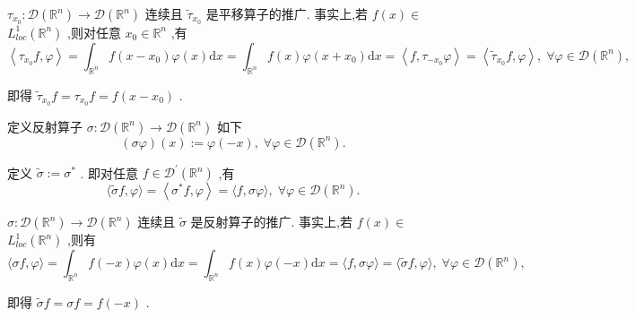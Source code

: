 \documentclass[lang=cn,newtx,10pt,scheme=chinese,thmcnt=chapter]{elegantbook}
\newcommand{\dif}{\mathrm{d}}
\begin{document}
\begin{note}
   \({\tau }_{{x}_{0}} : \mathcal{D}\left( {\mathbb{R}}^{n}\right)  \rightarrow  \mathcal{D}\left( {\mathbb{R}}^{n}\right)\) 连续且 \({\widetilde{\tau }}_{{x}_{0}}\) 是平移算子的推广. 事实上,若 \(f\left( x\right)  \in\)  \({L}_{loc}^{1}\left( {\mathbb{R}}^{n}\right)\) ,则对任意 \({x}_{0} \in  {\mathbb{R}}^{n}\) ,有
\begin{equation*}
\left\langle  {{\tau }_{{x}_{0}}f,\varphi }\right\rangle   = {\int }_{{\mathbb{R}}^{n}}f\left( {x - {x}_{0}}\right) \varphi \left( x\right) {\dif x} = {\int }_{{\mathbb{R}}^{n}}f\left( x\right) \varphi \left( {x + {x}_{0}}\right) {\dif x}
= \left\langle  {f,{\tau }_{-{x}_{0}}\varphi }\right\rangle   = \left\langle  {{\widetilde{\tau }}_{{x}_{0}}f,\varphi }\right\rangle  ,\;\forall \varphi  \in  \mathcal{D}\left( {\mathbb{R}}^{n}\right) ,
\end{equation*}

即得 \({\widetilde{\tau }}_{{x}_{0}}f = {\tau }_{{x}_{0}}f = f\left( {x - {x}_{0}}\right)\) .
\end{note}
\begin{definition}
  定义反射算子 \(\sigma  : \mathcal{D}\left( {\mathbb{R}}^{n}\right)  \rightarrow  \mathcal{D}\left( {\mathbb{R}}^{n}\right)\) 如下  \begin{equation*}
  \left( {\sigma \varphi }\right) \left( x\right)  \mathrel{\text{ := }} \varphi \left( {-x}\right) ,\;\forall \varphi  \in  \mathcal{D}\left( {\mathbb{R}}^{n}\right) .
  \end{equation*}
  
  定义 \(\widetilde{\sigma } \mathrel{\text{ := }} {\sigma }^{ * }\) . 即对任意 \(f \in  {\mathcal{D}}^{\prime }\left( {\mathbb{R}}^{n}\right)\) ,有
\begin{equation*}
  \langle \widetilde{\sigma }f,\varphi \rangle  = \left\langle  {{\sigma }^{ * }f,\varphi }\right\rangle   = \langle f,{\sigma \varphi }\rangle ,\;\forall \varphi  \in  \mathcal{D}\left( {\mathbb{R}}^{n}\right) .
  \end{equation*}
  
\end{definition}
\begin{note}
\(\sigma  : \mathcal{D}\left( {\mathbb{R}}^{n}\right)  \rightarrow  \mathcal{D}\left( {\mathbb{R}}^{n}\right)\) 连续且 \(\widetilde{\sigma }\) 是反射算子的推广. 事实上,若 \(f\left( x\right)  \in\)  \({L}_{loc}^{1}\left( {\mathbb{R}}^{n}\right)\) ,则有
\begin{equation*}
\langle {\sigma f},\varphi \rangle  = {\int }_{{\mathbb{R}}^{n}}f\left( {-x}\right) \varphi \left( x\right) {\dif x} = {\int }_{{\mathbb{R}}^{n}}f\left( x\right) \varphi \left( {-x}\right) {\dif x}
= \langle f,{\sigma \varphi }\rangle  = \langle \widetilde{\sigma }f,\varphi \rangle ,\;\forall \varphi  \in  \mathcal{D}\left( {\mathbb{R}}^{n}\right) ,
\end{equation*}

即得 \(\widetilde{\sigma }f = {\sigma f} = f\left( {-x}\right)\) .
\end{note} 
\end{document}
